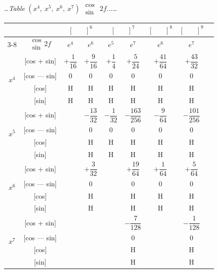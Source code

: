 \documentclass[10pt,a4paper]{article}
\newcommand{\tabletitle}[2]{%
  \begin{center}
  \ldots\textit{Table} #1 $\displaystyle\begin{smallmatrix} \cos \\ \sin \end{smallmatrix}$ #2\ldots
  \end{center}
}
\begin{document}
\vspace{1em}

\tabletitle{$(x^4,\ x^5,\ x^6,\ x^7)$}{$2f\ldots$}

\begin{center}
\small
\begin{tabular}{|c|c|c|c|c|c|c|c|c|}
\hline
& & \multicolumn{2}{c|}{$[\phantom{()}]^6$} & \multicolumn{2}{c|}{$[\phantom{()}]^7$} & \multicolumn{1}{c|}{$[\phantom{()}]^8$} & \multicolumn{1}{c|}{$[\phantom{()}]^9$} \\
\cline{3-8}
& $\begin{smallmatrix} \cos \\ \sin \end{smallmatrix} 2f$ & $e^4$ & $e^6$ & $e^5$ & $e^7$ & $e^6$ & $e^7$ \\
\hline
\multirow{4}{*}{$x^4$} & [cos + sin] & $+\dfrac{1}{16}$ & $+\dfrac{9}{16}$ & $+\dfrac{1}{4}$ & $+\dfrac{5}{24}$ & $+\dfrac{41}{64}$ & $+\dfrac{43}{32}$ \\
& [cos --- sin] & $0$ & $0$ & $0$ & $0$ & $0$ & $0$ \\
& [cos] & H & H & H & H & H & H \\
& [sin] & H & H & H & H & H & H \\
\hline
\multirow{4}{*}{$x^5$} & [cos + sin] & & $-\dfrac{13}{32}$ & $-\dfrac{1}{32}$ & $-\dfrac{163}{256}$ & $-\dfrac{9}{64}$ & $-\dfrac{101}{256}$ \\
& [cos --- sin] & & $0$ & $0$ & $0$ & $0$ & $0$ \\
& [cos] & & H & H & H & H & H \\
& [sin] & & H & H & H & H & H \\
\hline
\multirow{4}{*}{$x^6$} & [cos + sin] & & $+\dfrac{3}{32}$ & & $+\dfrac{19}{64}$ & $+\dfrac{1}{64}$ & $+\dfrac{5}{64}$ \\
& [cos --- sin] & & $0$ & & $0$ & $0$ & $0$ \\
& [cos] & & H & & H & H & H \\
& [sin] & & H & & H & H & H \\
\hline
\multirow{4}{*}{$x^7$} & [cos + sin] & & & & $-\dfrac{7}{128}$ & & $-\dfrac{1}{128}$ \\
& [cos --- sin] & & & & $0$ & & $0$ \\
& [cos] & & & & H & & H \\
& [sin] & & & & H & & H \\
\hline
\end{tabular}
\end{center}
\end{document}
